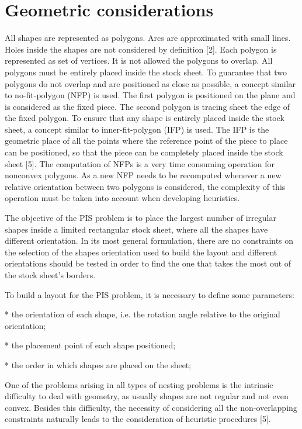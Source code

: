 \documentclass{llncs}
\begin{document}
\section{Geometric considerations}
%
All shapes are represented as polygons. Arcs are approximated with small lines. Holes inside the shapes are not considered by definition [2]. Each polygon is represented as set of vertices. It is not allowed the polygons to overlap. All polygons must be entirely placed inside the stock sheet. To guarantee that two polygons do not overlap and are positioned as close as possible, a concept similar to no-fit-polygon (NFP) is used. The first polygon is positioned on the plane and is considered as the fixed piece. The second polygon is tracing sheet the edge of the fixed polygon. To ensure that any shape is entirely placed inside the stock sheet, a concept similar to inner-fit-polygon (IFP) is used. The IFP is the geometric place of all the points where the reference point of the piece to place can be positioned, so that the piece can be completely placed inside the stock sheet [5]. The computation of NFPs is a very time consuming operation for nonconvex polygons. As a new NFP needs to be recomputed whenever a new relative orientation between two polygons is considered, the complexity of this operation must be taken into account when developing heuristics.

The objective of the PIS problem is to place the largest number of irregular shapes inside a limited rectangular stock sheet, where all the shapes have different orientation. In its most general formulation, there are no constraints on the selection of the shapes orientation used to build the layout and different orientations should be tested in order to find the one that takes the most out of the stock sheet’s borders.

To build a layout for the PIS problem, it is necessary to define some parameters:

* the orientation of each shape, i.e. the rotation angle relative to the original orientation;

* the placement point of each shape positioned;

* the order in which shapes are placed on the sheet;

One of the problems arising in all types of nesting problems is the intrinsic difficulty to deal with geometry, as usually shapes are not regular and not even convex. Besides this difficulty, the necessity of considering all the non-overlapping constraints naturally leads to the consideration of heuristic procedures [5]. 
%
\end{document}
